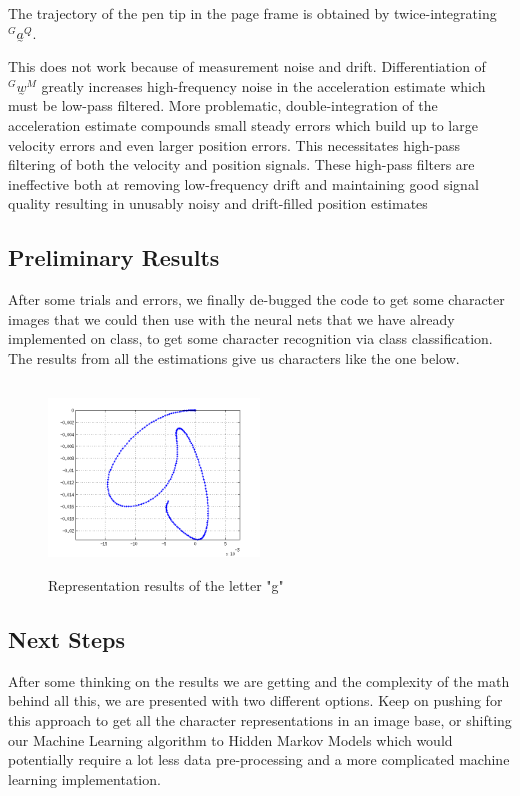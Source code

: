 \documentclass{article}
\begin{document}
The trajectory of the pen tip in the page frame is obtained by
twice-integrating $^G \underset{\mbox{\textasciitilde}}{a}^Q$.

This does not work because of measurement noise and drift. Differentiation
of $^G \underset{\mbox{\textasciitilde}}{w}^M$ greatly increases
high-frequency noise in the acceleration estimate which must be low-pass
filtered. More problematic, double-integration of the acceleration estimate
compounds small steady errors which build up to large velocity errors and even
larger position errors. This necessitates high-pass filtering of both the
velocity and position signals. These high-pass filters are ineffective both
at removing low-frequency drift and maintaining good signal quality resulting
in unusably noisy and drift-filled position estimates

\subsection{Preliminary Results}
After some trials and errors, we finally de-bugged the code to get some character images that we could then use with the neural nets that we have already implemented on class, to get some character recognition via class classification.
The results from all the estimations give us characters like the one below.
\begin{figure}[H]
\centering
    \includegraphics[width=0.5\textwidth, height= 5cm]{g.png}
    \caption{Representation results of the letter "g"}
\end{figure}


\subsection{Next Steps}
After some thinking on the results we are getting and the complexity of the math behind all this, we are presented with two different options. Keep on pushing for this approach to get all the character representations in an image base, or shifting our Machine Learning algorithm to Hidden Markov Models which would potentially require a lot less data pre-processing and a more complicated machine learning implementation.
 
\end{document}
